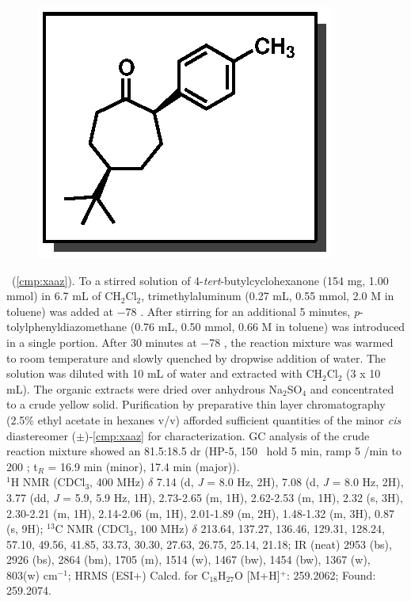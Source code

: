 
\pagebreak
\begin{figure}
  \vspace{-22pt}
  \begin{center}
    \includegraphics[scale=0.8]{chp_asymmetric/images/xaaz}
  \end{center}
  \vspace{-30pt}
\end{figure}\noindent \textbf{\CMPxaaz}\ (\ref{cmp:xaaz}).  To a stirred solution of
4-\textit{tert}-butylcyclohexanone (154 mg, 1.00 mmol) in 6.7 mL of CH$_2$Cl$_2$, trimethylaluminum
(0.27 mL, 0.55 mmol, 2.0 M in toluene) was added at $-$78 \degc. After stirring for an additional 5
minutes, \textit{p}-tolylphenyldiazomethane (0.76 mL, 0.50 mmol, 0.66 M in toluene) was introduced
in a single portion. After 30 minutes at $-$78 \degc, the reaction mixture was warmed to room
temperature and slowly quenched by dropwise addition of water. The solution was diluted with 10 mL
of water and extracted with CH$_2$Cl$_2$ (3 x 10 mL). The organic extracts were dried over anhydrous
Na$_2$SO$_4$ and concentrated to a crude yellow solid. Purification by preparative thin layer
chromatography (2.5\% ethyl acetate in hexanes v/v) afforded sufficient quantities of the minor
\textit{cis} diastereomer ($\pm$)-\ref{cmp:xaaz} for characterization. GC analysis of the crude
reaction mixture showed an 81.5:18.5 dr (HP-5, 150 \degc\ hold 5 min, ramp 5 \degc/min to 200 \degc;
t$_R$ = 16.9 min (minor), 17.4 min (major)).\\
$^1$H NMR (CDCl$_3$, 400 MHz) $\delta$ 7.14 (d, \textit{J} = 8.0 Hz, 2H), 7.08 (d, \textit{J} = 8.0
Hz, 2H), 3.77 (dd, \textit{J} = 5.9, 5.9 Hz, 1H), 2.73-2.65 (m, 1H), 2.62-2.53 (m, 1H), 2.32 (s,
3H), 2.30-2.21 (m, 1H), 2.14-2.06 (m, 1H), 2.01-1.89 (m, 2H), 1.48-1.32 (m, 3H), 0.87 (s, 9H);
$^{13}$C NMR (CDCl$_3$, 100 MHz) $\delta$ 213.64, 137.27, 136.46, 129.31, 128.24, 57.10, 49.56,
41.85, 33.73, 30.30, 27.63, 26.75, 25.14, 21.18; IR (neat) 2953 (bs), 2926 (bs), 2864 (bm), 1705
(m), 1514 (w), 1467 (bw), 1454 (bw), 1367 (w), 803(w)  cm$^{-1}$; HRMS (ESI+) Calcd. for
C$_{18}$H$_{27}$O [M+H]$^+$: 259.2062; Found: 259.2074.

